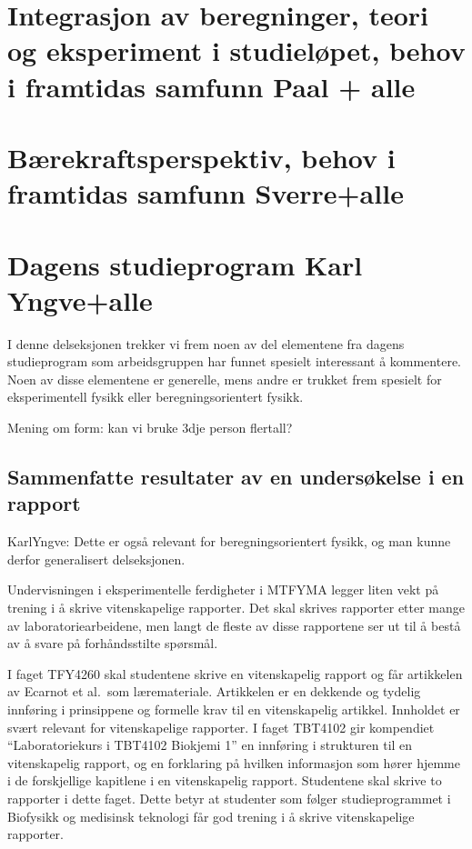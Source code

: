 \documentclass{article}
\begin{document}
\section{Integrasjon av beregninger, teori og eksperiment i studieløpet, behov i framtidas samfunn {\color{red} Paal + alle}}

\section{Bærekraftsperspektiv, behov i framtidas samfunn {\color{red} Sverre+alle}}

\section{Dagens studieprogram {\color{red} Karl Yngve+alle}}
\label{Sammenlikning}

I denne delseksjonen trekker vi frem noen av del elementene fra dagens studieprogram som arbeidsgruppen har funnet spesielt interessant å kommentere.
Noen av disse elementene er generelle, mens andre er trukket frem spesielt for eksperimentell fysikk eller beregningsorientert fysikk.

{\color{red} Mening om form: kan vi bruke 3dje person flertall?}

\subsection{Sammenfatte resultater av en undersøkelse i en rapport}
\label{Rapport}
{\color{red} KarlYngve: Dette er også relevant for beregningsorientert fysikk, og man kunne derfor generalisert delseksjonen.}

Undervisningen i eksperimentelle ferdigheter i MTFYMA legger liten vekt på trening i å skrive vitenskapelige rapporter. Det skal skrives rapporter etter mange av laboratoriearbeidene, men langt de fleste av disse rapportene ser ut til å bestå av å svare på forhåndsstilte spørsmål.

I faget TFY4260 skal studentene skrive en vitenskapelig rapport og får artikkelen av Ecarnot et al.~som læremateriale. Artikkelen er en dekkende og tydelig innføring i prinsippene og formelle krav til en vitenskapelig artikkel. Innholdet er svært relevant for vitenskapelige rapporter. I faget TBT4102 gir kompendiet ``Laboratoriekurs i TBT4102 Biokjemi 1'' en innføring i strukturen til en vitenskapelig rapport, og en forklaring på hvilken informasjon som hører hjemme i de forskjellige kapitlene i en vitenskapelig rapport. Studentene skal skrive to rapporter i dette faget. Dette betyr at studenter som følger studieprogrammet i Biofysikk og medisinsk teknologi får god trening i å skrive vitenskapelige rapporter.
\end{document}
